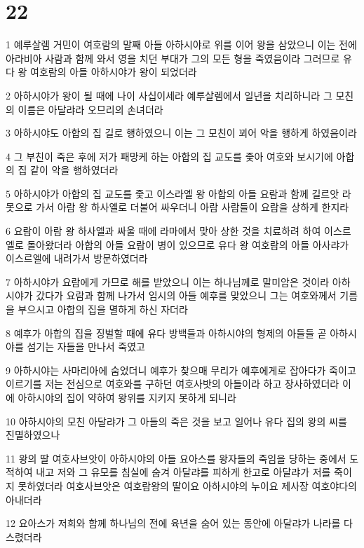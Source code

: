\chapter{22}

\par 1 예루살렘 거민이 여호람의 말째 아들 아하시야로 위를 이어 왕을 삼았으니 이는 전에 아라비아 사람과 함께 와서 영을 치던 부대가 그의 모든 형을 죽였음이라 그러므로 유다 왕 여호람의 아들 아하시야가 왕이 되었더라
\par 2 아하시야가 왕이 될 때에 나이 사십이세라 예루살렘에서 일년을 치리하니라 그 모친의 이름은 아달랴라 오므리의 손녀더라
\par 3 아하시야도 아합의 집 길로 행하였으니 이는 그 모친이 꾀어 악을 행하게 하였음이라
\par 4 그 부친이 죽은 후에 저가 패망케 하는 아합의 집 교도를 좇아 여호와 보시기에 아합의 집 같이 악을 행하였더라
\par 5 아하시야가 아합의 집 교도를 좇고 이스라엘 왕 아합의 아들 요람과 함께 길르앗 라못으로 가서 아람 왕 하사엘로 더불어 싸우더니 아람 사람들이 요람을 상하게 한지라
\par 6 요람이 아람 왕 하사엘과 싸울 때에 라마에서 맞아 상한 것을 치료하려 하여 이스르엘로 돌아왔더라 아합의 아들 요람이 병이 있으므로 유다 왕 여호람의 아들 아사랴가 이스르엘에 내려가서 방문하였더라
\par 7 아하시야가 요람에게 가므로 해를 받았으니 이는 하나님께로 말미암은 것이라 아하시야가 갔다가 요람과 함께 나가서 임시의 아들 예후를 맞았으니 그는 여호와께서 기름을 부으시고 아합의 집을 멸하게 하신 자더라
\par 8 예후가 아합의 집을 징벌할 때에 유다 방백들과 아하시야의 형제의 아들들 곧 아하시야를 섬기는 자들을 만나서 죽였고
\par 9 아하시야는 사마리아에 숨었더니 예후가 찾으매 무리가 예후에게로 잡아다가 죽이고 이르기를 저는 전심으로 여호와를 구하던 여호사밧의 아들이라 하고 장사하였더라 이에 아하시야의 집이 약하여 왕위를 지키지 못하게 되니라
\par 10 아하시야의 모친 아달랴가 그 아들의 죽은 것을 보고 일어나 유다 집의 왕의 씨를 진멸하였으나
\par 11 왕의 딸 여호사브앗이 아하시야의 아들 요아스를 왕자들의 죽임을 당하는 중에서 도적하여 내고 저와 그 유모를 침실에 숨겨 아달랴를 피하게 한고로 아달랴가 저를 죽이지 못하였더라 여호사브앗은 여호람왕의 딸이요 아하시야의 누이요 제사장 여호야다의 아내더라
\par 12 요아스가 저희와 함께 하나님의 전에 육년을 숨어 있는 동안에 아달랴가 나라를 다스렸더라

